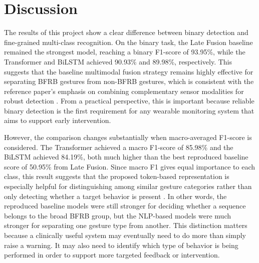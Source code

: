 \documentclass[conference]{IEEEtran}
\begin{document}
\clearpage

















\clearpage
\section{Discussion}
\label{sec:discussion}

The results of this project show a clear difference between binary detection and fine-grained multi-class recognition. On the binary task, the Late Fusion baseline remained the strongest model, reaching a binary F1-score of 93.95\%, while the Transformer and BiLSTM achieved 90.93\% and 89.98\%, respectively. This suggests that the baseline multimodal fusion strategy remains highly effective for separating BFRB gestures from non-BFRB gestures, which is consistent with the reference paper's emphasis on combining complementary sensor modalities for robust detection \cite{zhang2025detection}. From a practical perspective, this is important because reliable binary detection is the first requirement for any wearable monitoring system that aims to support early intervention.

However, the comparison changes substantially when macro-averaged F1-score is considered. The Transformer achieved a macro F1-score of 85.98\% and the BiLSTM achieved 84.19\%, both much higher than the best reproduced baseline score of 50.95\% from Late Fusion. Since macro F1 gives equal importance to each class, this result suggests that the proposed token-based representation is especially helpful for distinguishing among similar gesture categories rather than only detecting whether a target behavior is present \cite{zhang2025detection}. In other words, the reproduced baseline models were still stronger for deciding whether a sequence belongs to the broad BFRB group, but the NLP-based models were much stronger for separating one gesture type from another. This distinction matters because a clinically useful system may eventually need to do more than simply raise a warning. It may also need to identify which type of behavior is being performed in order to support more targeted feedback or intervention.
\end{document}
